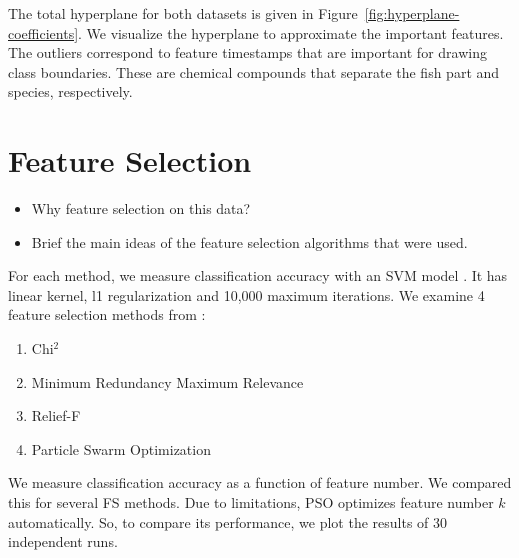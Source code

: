 \documentclass[runningheads]{llncs}
\begin{document}
The total hyperplane for both datasets is given in Figure~\ref{fig:hyperplane-coefficients}.
We visualize the hyperplane to approximate the important features. 
The outliers correspond to feature timestamps that are important for drawing class boundaries. 
These are chemical compounds that separate the fish part and species, respectively. 

\section{Feature Selection}


\begin{itemize}
  \item Why feature selection on this data? 
  \item Brief the main ideas of the feature selection algorithms that were used. 
\end{itemize}

For each method, we measure classification accuracy with an SVM model \cite{sklearn2021feature}.
It has linear kernel, l1 regularization \cite{robnik2003theoretical} and 10,000 maximum iterations.
We examine 4 feature selection methods from \cite{li2018feature}:

\begin{enumerate}
  \item Chi$^2$ \cite{liu1995chi2}
  \item Minimum Redundancy Maximum Relevance \cite{ding2005minimum}
  \item Relief-F \cite{robnik2003theoretical}
  \item Particle Swarm Optimization \cite{kennedy1995particle,kennedy1997discrete}
\end{enumerate}

We measure classification accuracy as a function of feature number.
We compared this for several FS methods.
Due to limitations, PSO optimizes feature number $k$ automatically.
So, to compare its performance, we plot the results of 30 independent runs.
\\\\

\end{document}
